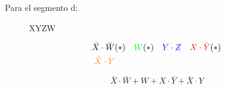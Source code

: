 Para el segmento d:
\begin{figure}[H]
  \centering
    \begin{Karnaugh}{X}{Y}{Z}{W}
    \end{Karnaugh}
\end{figure}

\begin{align*}
  \bar{X} \cdot \bar{W} & (*) &
  \color{green} W & (*) &
  \color{blue} Y \cdot Z & &
  \color{red} X \cdot \bar{Y} & (*) \\
  \color{orange} \bar{X}\cdot Y
  \color{black}
\end{align*}

\begin{equation*}
  \bar{X} \cdot \bar{W} +
  W +
  X \cdot \bar{Y} +
  \bar{X}\cdot Y
\end{equation*}
